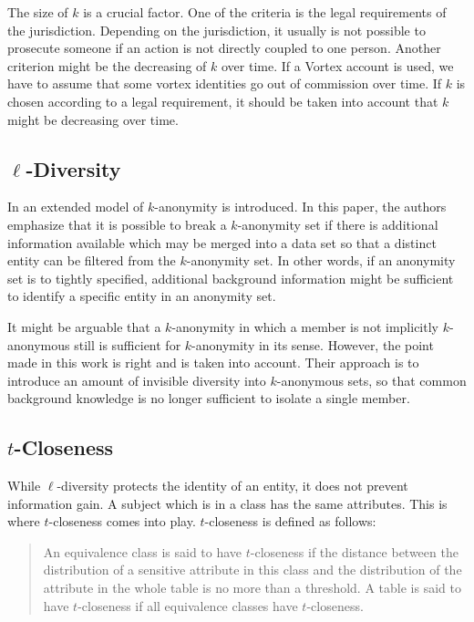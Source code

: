 The size of $k$ is a crucial factor. One of the criteria is the legal requirements of the jurisdiction. Depending on the jurisdiction, it usually is not possible to prosecute someone if an action is not directly coupled to one person. Another criterion might be the decreasing of $k$ over time. If a Vortex account is used, we have to assume that some vortex identities go out of commission over time. If $k$ is chosen according to a legal requirement, it should be taken into account that $k$ might be decreasing over time.

\subsection{\texorpdfstring{$\ell$}{l}-Diversity}
In \cite{machanavajjhala2007diversity} an extended model of $k$-anonymity is introduced. In this paper, the authors emphasize that it is possible to break a $k$-anonymity set if there is additional information available which may be merged into a data set so that a distinct entity can be filtered from the $k$-anonymity set. In other words, if an anonymity set is to tightly specified, additional background information might be sufficient to identify a specific entity in an anonymity set.

It might be arguable that a $k$-anonymity in which a member is not implicitly $k$-anonymous still is sufficient for $k$-anonymity in its sense. However, the point made in this work is right and is taken into account. Their approach is to introduce an amount of invisible diversity into $k$-anonymous sets, so that common background knowledge is no longer sufficient to isolate a single member.

\subsection{\texorpdfstring{$t$}{t}-Closeness}
While $\ell$-diversity protects the identity of an entity, it does not prevent information gain. A subject which is in a class has the same attributes. This is where $t$-closeness\cite{li2007t} comes into play. $t$-closeness is defined as follows:

\begin{quote}
	An equivalence class is said to have $t$-closeness if the distance between the distribution of a sensitive attribute in this class and the distribution of the attribute in the whole table is no more than a threshold. A table is said to have $t$-closeness if all equivalence classes have $t$-closeness.
\end{quote}

